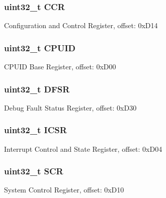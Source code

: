 \subsubsection[{C\+C\+R}]{\setlength{\rightskip}{0pt plus 5cm}uint32\+\_\+t C\+C\+R}\label{struct_s_c_b___mem_map_a9f5754479885a80651e6ce99ce44fbeb}
Configuration and Control Register, offset\+: 0x\+D14 \hypertarget{struct_s_c_b___mem_map_a1e5baee14946bb64bd1e68e481f6d6b0}{}
\subsubsection[{C\+P\+U\+I\+D}]{\setlength{\rightskip}{0pt plus 5cm}uint32\+\_\+t C\+P\+U\+I\+D}\label{struct_s_c_b___mem_map_a1e5baee14946bb64bd1e68e481f6d6b0}
C\+P\+U\+I\+D Base Register, offset\+: 0x\+D00 \hypertarget{struct_s_c_b___mem_map_ae8d2d700d6a9735423a52a48a62b50b6}{}
\subsubsection[{D\+F\+S\+R}]{\setlength{\rightskip}{0pt plus 5cm}uint32\+\_\+t D\+F\+S\+R}\label{struct_s_c_b___mem_map_ae8d2d700d6a9735423a52a48a62b50b6}
Debug Fault Status Register, offset\+: 0x\+D30 \hypertarget{struct_s_c_b___mem_map_a66ceabdaf0762f2f5935c87b80e0b246}{}
\subsubsection[{I\+C\+S\+R}]{\setlength{\rightskip}{0pt plus 5cm}uint32\+\_\+t I\+C\+S\+R}\label{struct_s_c_b___mem_map_a66ceabdaf0762f2f5935c87b80e0b246}
Interrupt Control and State Register, offset\+: 0x\+D04 \hypertarget{struct_s_c_b___mem_map_ae6694fb5a69483450401814d4d2aadae}{}
\subsubsection[{S\+C\+R}]{\setlength{\rightskip}{0pt plus 5cm}uint32\+\_\+t S\+C\+R}\label{struct_s_c_b___mem_map_ae6694fb5a69483450401814d4d2aadae}
System Control Register, offset\+: 0x\+D10 \hypertarget{struct_s_c_b___mem_map_aabb6b7677f7a0a50ce6fae3b63eb943d}{}
